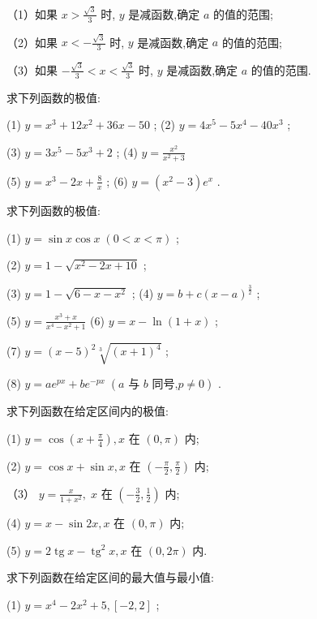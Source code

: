 \documentclass[lang=cn,newtx,10pt,scheme=chinese]{elegantbook}
\begin{document}
\begin{problemset}[习 题 十 一]
（1）如果 \(x > \frac{\sqrt{3}}{3}\) 时, \(y\) 是减函数,确定 \(a\) 的值的范围;

（2）如果 \(x < - \frac{\sqrt{3}}{3}\) 时, \(y\) 是减函数,确定 \(a\) 的值的范围;

（3）如果 \(- \frac{\sqrt{3}}{3} < x < \frac{\sqrt{3}}{3}\) 时, \(y\) 是减函数,确定 \(a\) 的值的范围.

\item 求下列函数的极值:

(1) \(y = {x}^{3} + {12}{x}^{2} + {36x} - {50}\) ; (2) \(y = 4{x}^{5} - 5{x}^{4} - {40}{x}^{3}\) ;

(3) \(y = 3{x}^{5} - 5{x}^{3} + 2\) ; (4) \(y = \frac{{x}^{2}}{{x}^{2} + 3}\)

(5) \(y = {x}^{3} - {2x} + \frac{8}{x}\) ; (6) \(y = \left( {{x}^{2} - 3}\right) {e}^{x}\) .

\item 求下列函数的极值:

(1) \(y = \sin x\cos x\;\left( {0 < x < \pi }\right)\) ;

(2) \(y = 1 - \sqrt{{x}^{2} - {2x} + {10}}\) ;

(3) \(y = 1 - \sqrt{6 - x - {x}^{2}}\) ; (4) \(y = b + c{\left( x - a\right) }^{\frac{3}{2}}\) ;

(5) \(y = \frac{{x}^{3} + x}{{x}^{4} - {x}^{2} + 1}\) (6) \(y = x - \ln \left( {1 + x}\right)\) ;

(7) \(y = {\left( x - 5\right) }^{2}\sqrt[3]{{\left( x + 1\right) }^{4}}\) ;

(8) \(y = a{e}^{px} + b{e}^{-{px}}\;\left( {a\text{ 与 }b\text{ 同号,}p \neq 0}\right)\) .

\item 求下列函数在给定区间内的极值:

(1) \(y = \cos \left( {x + \frac{\pi }{4}}\right) ,x\) 在 \(\left( {0,\pi }\right)\) 内;

(2) \(y = \cos x + \sin x,x\) 在 \(\left( {-\frac{\pi }{2},\frac{\pi }{2}}\right)\) 内;

（3） \(y = \frac{x}{1 + {x}^{2}},\;x\) 在 \(\left( {-\frac{3}{2},\frac{1}{2}}\right)\) 内;

(4) \(y = x - \sin {2x},x\) 在 \(\left( {0,\pi }\right)\) 内;

(5) \(y = 2\operatorname{tg}x - {\operatorname{tg}}^{2}x,x\) 在 \(\left( {0,{2\pi }}\right)\) 内.

\item 求下列函数在给定区间的最大值与最小值:

(1) \(y = {x}^{4} - 2{x}^{2} + 5,\left\lbrack {-2,2}\right\rbrack\) ;


\end{problemset}
\end{document}

